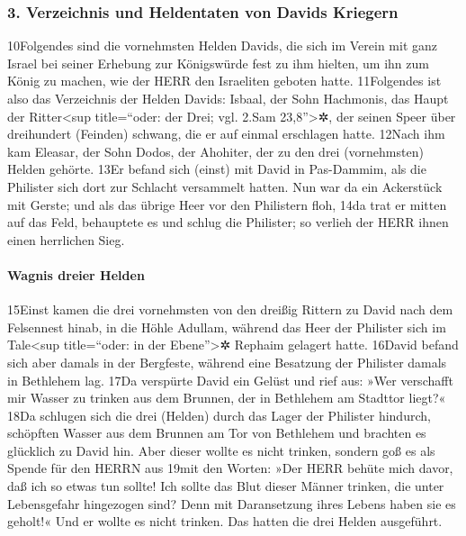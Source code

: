 \hypertarget{verzeichnis-und-heldentaten-von-davids-kriegern}{%
\subsubsection{3. Verzeichnis und Heldentaten von Davids
Kriegern}\label{verzeichnis-und-heldentaten-von-davids-kriegern}}

10Folgendes sind die vornehmsten Helden Davids, die sich im Verein mit
ganz Israel bei seiner Erhebung zur Königswürde fest zu ihm hielten, um
ihn zum König zu machen, wie der HERR den Israeliten geboten hatte.
11Folgendes ist also das Verzeichnis der Helden Davids: Isbaal, der Sohn
Hachmonis, das Haupt der Ritter\textless sup title=``oder: der Drei;
vgl. 2.Sam 23,8''\textgreater✲, der seinen Speer über dreihundert
(Feinden) schwang, die er auf einmal erschlagen hatte. 12Nach ihm kam
Eleasar, der Sohn Dodos, der Ahohiter, der zu den drei (vornehmsten)
Helden gehörte. 13Er befand sich (einst) mit David in Pas-Dammim, als
die Philister sich dort zur Schlacht versammelt hatten. Nun war da ein
Ackerstück mit Gerste; und als das übrige Heer vor den Philistern floh,
14da trat er mitten auf das Feld, behauptete es und schlug die
Philister; so verlieh der HERR ihnen einen herrlichen Sieg.

\hypertarget{wagnis-dreier-helden}{%
\paragraph{Wagnis dreier Helden}\label{wagnis-dreier-helden}}

15Einst kamen die drei vornehmsten von den dreißig Rittern zu David nach
dem Felsennest hinab, in die Höhle Adullam, während das Heer der
Philister sich im Tale\textless sup title=``oder: in der
Ebene''\textgreater✲ Rephaim gelagert hatte. 16David befand sich aber
damals in der Bergfeste, während eine Besatzung der Philister damals in
Bethlehem lag. 17Da verspürte David ein Gelüst und rief aus: »Wer
verschafft mir Wasser zu trinken aus dem Brunnen, der in Bethlehem am
Stadttor liegt?« 18Da schlugen sich die drei (Helden) durch das Lager
der Philister hindurch, schöpften Wasser aus dem Brunnen am Tor von
Bethlehem und brachten es glücklich zu David hin. Aber dieser wollte es
nicht trinken, sondern goß es als Spende für den HERRN aus 19mit den
Worten: »Der HERR behüte mich davor, daß ich so etwas tun sollte! Ich
sollte das Blut dieser Männer trinken, die unter Lebensgefahr hingezogen
sind? Denn mit Daransetzung ihres Lebens haben sie es geholt!« Und er
wollte es nicht trinken. Das hatten die drei Helden ausgeführt.

